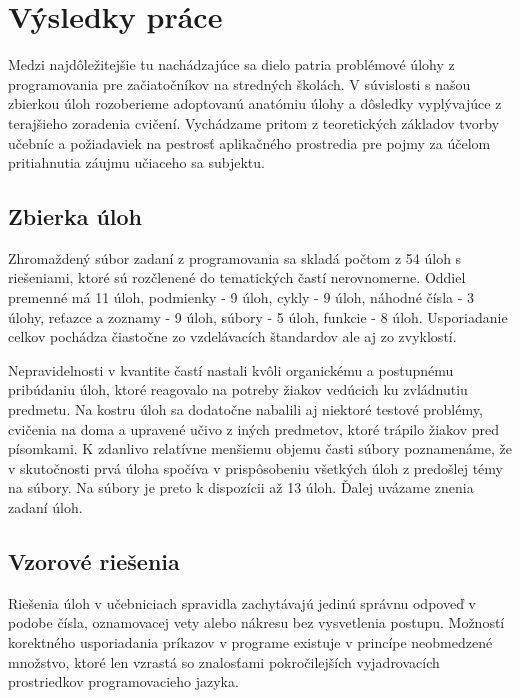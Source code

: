 \chapter{Výsledky práce}
Medzi najdôležitejšie tu nachádzajúce sa dielo patria problémové úlohy z programovania pre začiatočníkov na stredných školách. V súvislosti s našou zbierkou úloh rozoberieme adoptovanú anatómiu úlohy a dôsledky vyplývajúce z terajšieho zoradenia cvičení. Vychádzame pritom z teoretických základov tvorby učebníc a požiadaviek na pestrosť aplikačného prostredia pre pojmy za účelom pritiahnutia záujmu učiaceho sa subjektu.

\section{Zbierka úloh}
Zhromaždený súbor zadaní z programovania sa skladá počtom z 54 úloh s riešeniami, ktoré sú rozčlenené do tematických častí nerovnomerne. Oddiel premenné má 11 úloh, podmienky - 9 úloh, cykly - 9 úloh, náhodné čísla - 3 úlohy, reťazce a zoznamy - 9 úloh, súbory - 5 úloh, funkcie - 8 úloh. Usporiadanie celkov pochádza čiastočne zo vzdelávacích štandardov ale aj zo zvyklostí.

Nepravidelnosti v kvantite častí nastali kvôli organickému a postupnému pribúdaniu úloh, ktoré reagovalo na potreby žiakov vedúcich ku zvládnutiu predmetu. Na kostru úloh sa dodatočne nabalili aj niektoré testové problémy, cvičenia na doma a upravené učivo z iných predmetov, ktoré trápilo žiakov pred písomkami. K zdanlivo relatívne menšiemu objemu časti súbory poznamenáme, že v skutočnosti prvá úloha spočíva v prispôsobeniu všetkých úloh z predošlej témy na súbory. Na súbory je preto k dispozícii až 13 úloh. Ďalej uvázame znenia zadaní úloh.









\section{Vzorové riešenia}
Riešenia úloh v učebniciach spravidla zachytávajú jedinú správnu odpoveď v podobe čísla, oznamovacej vety alebo nákresu bez vysvetlenia postupu. Možností korektného usporiadania príkazov v programe existuje v princípe neobmedzené množstvo, ktoré len vzrastá so znalosťami pokročilejších vyjadrovacích prostriedkov programovacieho jazyka.

